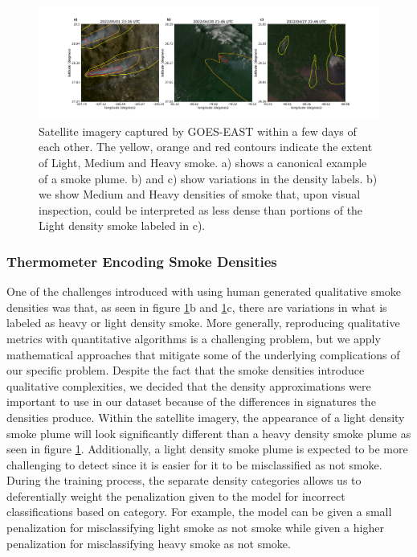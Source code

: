 \documentclass{article}
\begin{document}
\begin{figure}
    \centering
    \includegraphics[width=14cm]{figures/Misclassified.png}
    \caption{Satellite imagery captured by GOES-EAST within a few days of each other. The yellow, orange and red contours indicate the extent of Light, Medium and Heavy smoke.  a) shows a canonical example of a smoke plume. b) and c) show variations in the density labels. b) we show Medium and Heavy densities of smoke that, upon visual inspection, could be interpreted as less dense than portions of the Light density smoke labeled in c).}\label{densities}
\end{figure}

\subsubsection*{Thermometer Encoding Smoke Densities}

One of the challenges introduced with using human generated qualitative smoke densities was that, as seen in figure \ref{densities}b and \ref{densities}c, there are variations in what is labeled as heavy or light density smoke. More generally, reproducing qualitative metrics with quantitative algorithms is a challenging problem, but we apply mathematical approaches that mitigate some of the underlying complications of our specific problem. Despite the fact that the smoke densities introduce qualitative complexities, we decided that the density approximations were important to use in our dataset because of the differences in signatures the densities produce. Within the satellite imagery, the appearance of a light density smoke plume will look significantly different than a heavy density smoke plume as seen in figure \ref{densities}. Additionally, a light density smoke plume is expected to be more challenging to detect since it is easier for it to be misclassified as not smoke. During the training process, the separate density categories allows us to deferentially weight the penalization given to the model for incorrect classifications based on category. For example, the model can be given a small penalization for misclassifying light smoke as not smoke while given a higher penalization for misclassifying heavy smoke as not smoke. 
\end{document}
